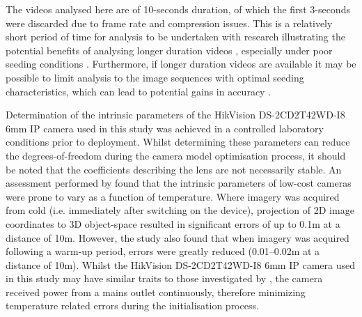 \documentclass[hess, manuscript]{copernicus} %
\begin{document}
The videos analysed here are of 10-seconds duration, of which the first 3-seconds were discarded due to frame rate and compression issues. This is a relatively short period of time for analysis to be undertaken with research illustrating the potential benefits of analysing longer duration videos \citep{pumo2021optical}, especially under poor seeding conditions \citep{dal2018exploring}. Furthermore, if longer duration videos are available it may be possible to limit analysis to the image sequences with optimal seeding characteristics, which can lead to potential gains in accuracy \citep{pizarro2020refining, pizarro2020}.

Determination of the intrinsic parameters of the HikVision DS-2CD2T42WD-I8 6mm IP camera used in this study was achieved in a controlled laboratory conditions prior to deployment. Whilst determining these parameters can reduce the degrees-of-freedom during the camera model optimisation process, it should be noted that the coefficients describing the lens are not necessarily stable. An assessment performed by \cite{elias2020} found that the intrinsic parameters of low-cost cameras were prone to vary as a function of temperature. Where imagery was acquired from cold (i.e. immediately after switching on the device), projection of 2D image coordinates to 3D object-space resulted in significant errors of up to 0.1m at a distance of 10m. However, the study also found that when imagery was acquired following a warm-up period, errors were greatly reduced (0.01--0.02m at a distance of 10m). Whilst the HikVision DS-2CD2T42WD-I8 6mm IP camera used in this study may have similar traits to those investigated by \cite{elias2020}, the camera received power from a mains outlet continuously, therefore minimizing temperature related errors during the initialisation process.
\end{document}
